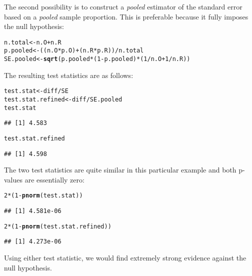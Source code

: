 \documentclass[addpoints,12pt]{exam}\usepackage[]{graphicx}\usepackage[]{color}
\makeatletter
\newcommand{\hlnum}[1]{\textcolor[rgb]{0.686,0.059,0.569}{#1}}%
\newcommand{\hlopt}[1]{\textcolor[rgb]{0,0,0}{#1}}%
\newcommand{\hlstd}[1]{\textcolor[rgb]{0.345,0.345,0.345}{#1}}%
\newcommand{\hlkwb}[1]{\textcolor[rgb]{0.69,0.353,0.396}{#1}}%
\newcommand{\hlkwd}[1]{\textcolor[rgb]{0.737,0.353,0.396}{\textbf{#1}}}%
\newenvironment{kframe}{%
 \def\at@end@of@kframe{}%
 \ifinner\ifhmode%
  \def\at@end@of@kframe{\end{minipage}}%
  \begin{minipage}{\columnwidth}%
 \fi\fi%
 \def\FrameCommand##1{\hskip\@totalleftmargin \hskip-\fboxsep
 \colorbox{shadecolor}{##1}\hskip-\fboxsep
     \hskip-\linewidth \hskip-\@totalleftmargin \hskip\columnwidth}%
 \MakeFramed {\advance\hsize-\width
   \@totalleftmargin\z@ \linewidth\hsize
   \@setminipage}}%
 {\par\unskip\endMakeFramed%
 \at@end@of@kframe}
\newenvironment{knitrout}{}{} %
\makeatother
\begin{document}
\begin{questions}
\begin{parts}
\begin{solution}
			The second possibility is to construct a \emph{pooled} estimator of the standard error based on a \emph{pooled} sample proportion. This is preferable because it fully imposes the null hypothesis:
\begin{knitrout}
\color{fgcolor}\begin{kframe}
\begin{alltt}
\hlstd{n.total} \hlkwb{<-} \hlstd{n.O} \hlopt{+} \hlstd{n.R}
\hlstd{p.pooled} \hlkwb{<-} \hlstd{((n.O} \hlopt{*} \hlstd{p.O)} \hlopt{+} \hlstd{(n.R} \hlopt{*} \hlstd{p.R))} \hlopt{/} \hlstd{n.total}
\hlstd{SE.pooled} \hlkwb{<-} \hlkwd{sqrt}\hlstd{(p.pooled} \hlopt{*} \hlstd{(}\hlnum{1} \hlopt{-} \hlstd{p.pooled)} \hlopt{*} \hlstd{(}\hlnum{1}\hlopt{/}\hlstd{n.O} \hlopt{+} \hlnum{1}\hlopt{/}\hlstd{n.R))}
\end{alltt}
\end{kframe}
\end{knitrout}
			The resulting test statistics are as follows:
\begin{knitrout}
\color{fgcolor}\begin{kframe}
\begin{alltt}
\hlstd{test.stat} \hlkwb{<-} \hlstd{diff} \hlopt{/} \hlstd{SE}
\hlstd{test.stat.refined} \hlkwb{<-} \hlstd{diff} \hlopt{/} \hlstd{SE.pooled}
\hlstd{test.stat}
\end{alltt}
\begin{verbatim}
## [1] 4.583
\end{verbatim}
\begin{alltt}
\hlstd{test.stat.refined}
\end{alltt}
\begin{verbatim}
## [1] 4.598
\end{verbatim}
\end{kframe}
\end{knitrout}
			The two test statistics are quite similar in this particular example and both p-values are essentially zero:
\begin{knitrout}
\color{fgcolor}\begin{kframe}
\begin{alltt}
\hlnum{2} \hlopt{*} \hlstd{(}\hlnum{1} \hlopt{-} \hlkwd{pnorm}\hlstd{(test.stat))}
\end{alltt}
\begin{verbatim}
## [1] 4.581e-06
\end{verbatim}
\begin{alltt}
\hlnum{2} \hlopt{*} \hlstd{(}\hlnum{1} \hlopt{-} \hlkwd{pnorm}\hlstd{(test.stat.refined))}
\end{alltt}
\begin{verbatim}
## [1] 4.273e-06
\end{verbatim}
\end{kframe}
\end{knitrout}
			Using either test statistic, we would find extremely strong evidence against the null hypothesis. 
			\end{solution}
		

\end{parts}
\end{questions}
\end{document}
